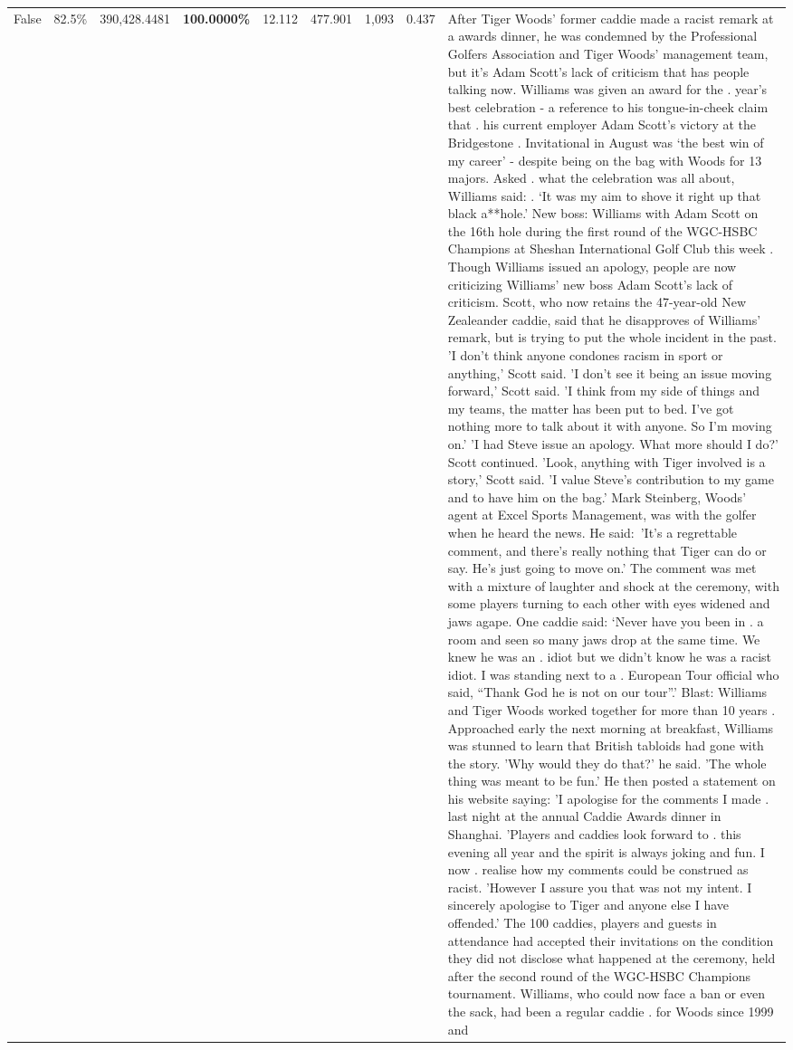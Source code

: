 \begin{table}[H]
\begin{tabular}{lllrlllll}
False & 82.5\% & 390,428.4481 & \bfseries \color{red} 100.0000\% & 12.112 & 477.901 & 1,093 & 0.437 & After Tiger Woods' former caddie made a racist remark at a awards dinner, he was condemned by the Professional Golfers Association and Tiger Woods' management team, but it's Adam Scott's lack of criticism that has people talking now. Williams was given an award for the . year’s best celebration - a reference to his tongue-in-cheek claim that . his current employer Adam Scott’s victory at the Bridgestone . Invitational in August was ‘the best win of my career’ - despite being on the bag with Woods for 13 majors. Asked . what the celebration was all about, Williams said: . ‘It was my aim to shove it right up that black a**hole.’ New boss: Williams with Adam Scott  on the 16th hole during the first round of the WGC-HSBC Champions at Sheshan International Golf Club this week . Though Williams issued an apology, people are now criticizing Williams' new boss Adam Scott's lack of criticism. Scott, who now retains the 47-year-old New Zealeander caddie, said that he disapproves of Williams' remark, but is trying to put the whole incident in the past. 'I don't think anyone condones racism in sport or anything,' Scott said. 'I don't see it being an issue moving forward,' Scott said. 'I think from my side of things and my teams, the matter has been put to bed. I've got nothing more to talk about it with anyone. So I'm moving on.' 'I had Steve issue an apology. What more should I do?' Scott continued. 'Look, anything with Tiger involved is a story,' Scott said. 'I value Steve's contribution to my game and to have him on the bag.' Mark Steinberg, Woods' agent at Excel Sports Management, was with the golfer when he heard the news. He said: 'It's a regrettable comment, and there's really nothing that Tiger can do or say. He's just going to move on.' The comment was met with a mixture of laughter and shock at the ceremony, with some players turning to each other with eyes widened and jaws agape. One caddie said: ‘Never have you been in . a room and seen so many jaws drop at the same time. We knew he was an . idiot but we didn’t know he was a racist idiot. I was standing next to a . European Tour official who said, “Thank God he is not on our tour”.’ Blast: Williams and Tiger Woods worked together for more than 10 years . Approached early the next morning at breakfast, Williams was stunned to learn that British tabloids had gone with the story. 'Why would they do that?' he said. 'The whole thing was meant to be fun.' He then posted a statement on his website saying: 'I apologise for the comments I made . last night at the annual Caddie Awards dinner in Shanghai. 'Players and caddies look forward to . this evening all year and the spirit is always joking and fun. I now . realise how my comments could be construed as racist. 'However I assure you that was not my intent. I sincerely apologise to Tiger and anyone else I have offended.' The 100 caddies, players and guests in attendance had accepted their invitations on the condition they did not disclose what happened at the ceremony, held after the second round of the WGC-HSBC Champions tournament. Williams, who could now face a ban or even the sack, had been a regular caddie . for Woods since 1999 and 
\end{tabular}
\end{table}
